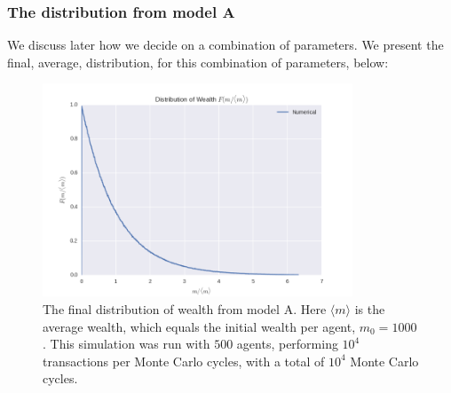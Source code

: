 \documentclass[a4paper, 10pt]{article}
\begin{document}
\subsubsection{The distribution from model A}

We discuss later how we decide on a combination of parameters. We present the final, average, distribution, for this combination of parameters, below:
\begin{figure}[!ht]
\centering
\includegraphics[height=2.5in]{distLamb0.png}
\caption{The final distribution of wealth from model A. Here $\langle m \rangle$ is the average wealth, which equals the initial wealth per agent, $m_0=1000$. This simulation was run with $500$ agents, performing $10^4$ transactions per Monte Carlo cycles, with a total of $10^4$ Monte Carlo cycles.}\label{fig:ModelA_final_distribution}
\end{figure}
\end{document}
